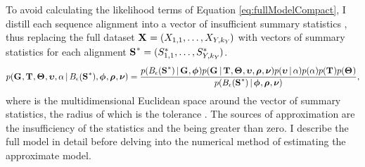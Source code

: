 \begin{linenomath}
To avoid calculating the likelihood terms of Equation \ref{eq:fullModelCompact},
I distill each sequence alignment \alignment{}{} into a vector of insufficient
summary statistics \alignmentSS{}{}, thus replacing the full dataset
$\alignmentVector = (\alignment{1}{1}, \ldots,
    \alignment{\npairs{}}{\nloci{\npairs{}}})$
with vectors of summary statistics for each alignment
$\ssVectorObs = (\alignmentSSObs{1}{1}, \ldots,
    \alignmentSSObs{\npairs{}}{\nloci{\npairs{}}})$.
{\small
\begin{equation}
    p(\geneTreeVector, \divTimeMapVector, \demographicParamVector, 
    \locusMutationRateScalarVector, \locusRateHetShapeParameter \given
    \ssSpace, \hkyModelVector, \ploidyScalarVector,
    \mutationRateScalarConstantVector) =
    \frac{p(\ssSpace \given \geneTreeVector, \hkyModelVector)
        p(\geneTreeVector \given \divTimeMapVector, \demographicParamVector,
        \locusMutationRateScalarVector, \ploidyScalarVector,
        \mutationRateScalarConstantVector)
        p(\locusMutationRateScalarVector \given \locusRateHetShapeParameter)
        p(\locusRateHetShapeParameter)
        p(\divTimeMapVector)
        p(\demographicParamVector)}{
        p(\ssSpace \given \hkyModelVector, \ploidyScalarVector,
        \mutationRateScalarConstantVector)},
    \label{eq:approxModelCompact}
\end{equation}
}
where \ssSpace is the multidimensional Euclidean space around the vector of
summary statistics, the radius of which is the tolerance \tol.
The sources of approximation are the insufficiency of the statistics and the
\tol being greater than zero.
I describe the full model in detail before delving into the numerical
method of estimating the approximate model.
\end{linenomath}

